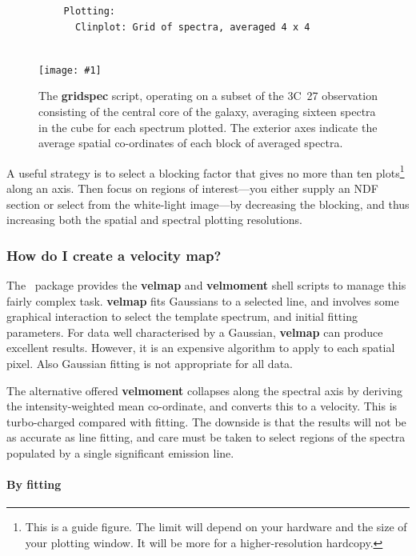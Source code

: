 \documentclass[twoside,11pt]{article}
\newcommand{\htmladdimg}[1]{}
\newcommand{\latex}[1]{#1}
\newcommand{\xref}[3]{#1}
\newcommand{\xlabel}[1]{}
\newcommand{\myfig} [5] {
  \begin{figure}[thb]
    \centering\texttt{[image: \#1]}
    \typeout{#1 inserted on page \arabic{page}}
    \caption{\label{#4}#5}
  \end{figure}
  }
\newcommand{\myfig}[5]{
    \label{#4} \htmladdimg{#3}\\
    Figure: #5\\
    }
\begin{document}
{\begin{verbatim}
          Plotting:
            Clinplot: Grid of spectra, averaged 4 x 4
               
\end{verbatim}\normalsize

\myfig{sc16_gridspec.eps}{height=0.5\textheight}{sc16_gridspec.gif}{sc16_gridspec_fig}{The
{\bf gridspec} script, operating on a subset of the 3C~27 observation
consisting of the central core of the galaxy, averaging sixteen
spectra in the cube for each spectrum plotted.  The exterior axes
indicate the average spatial co-ordinates of each block of averaged
spectra.}

A useful strategy is to select a blocking factor that gives no more
than ten plots\footnote{This is a guide figure.  The limit will
depend on your hardware and the size of your plotting window.  It will
be more for a higher-resolution hardcopy.} along an axis.  Then focus
on regions of interest---you either supply an NDF section or select
from the white-light image---by decreasing the blocking, and thus
increasing both the spatial and spectral plotting resolutions.


\subsubsection{\label{sc16_velmap}How do I create a velocity map?\xlabel{sc16_velmap}}

The \DATACUBE\ package provides the \xref{{\bf
velmap}}{sun237}{velmap} and \xref{{\bf velmoment}}{sun237}{velmoment}
shell scripts to manage this fairly complex task.  {\bf velmap} fits
Gaussians to a selected line, and involves some graphical interaction
to select the template spectrum, and initial fitting parameters. For
data well characterised by a Gaussian, {\bf velmap} can produce
excellent results.  However, it is an expensive algorithm to apply to
each spatial pixel.  Also Gaussian fitting is not appropriate for all
data. 

The alternative offered {\bf velmoment} collapses along the spectral
axis by deriving the intensity-weighted mean co-ordinate, and converts
this to a velocity.  This is turbo-charged compared with fitting.  The
downside is that the results will not be as accurate as line fitting,
and care must be taken to select regions of the spectra populated by a
single significant emission line.

\paragraph{\label{sc16_velfit}\latex{\vspace*{0.8em}}By
fitting\latex{\newline}\xlabel{sc16_velfit}}

}
\end{document}
